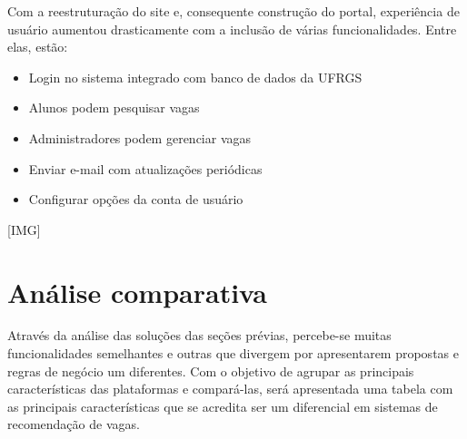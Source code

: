 \documentclass[cic,tc]{iiufrgs}
\begin{document}
Com a reestruturação do site e, consequente construção do portal, experiência de usuário aumentou drasticamente  com a inclusão de várias funcionalidades. Entre elas, estão:
\begin{itemize}
    \item Login no sistema integrado com banco de dados da UFRGS
    \item Alunos podem pesquisar vagas
    \item Administradores podem gerenciar vagas
    \item Enviar e-mail com atualizações periódicas
    \item Configurar opções da conta de usuário
\end{itemize}

[IMG]

\section{Análise comparativa}
\label{trabRelAnalise}

Através da análise das soluções das seções prévias, percebe-se muitas funcionalidades semelhantes e outras que divergem por apresentarem propostas e regras de negócio um diferentes. Com o objetivo de agrupar as principais características das plataformas e compará-las, será apresentada uma tabela com as principais características que se acredita ser um diferencial em sistemas de recomendação de vagas. 
\end{document}
